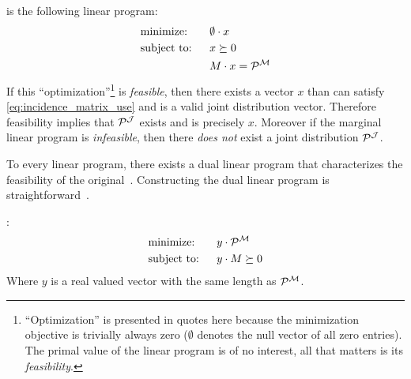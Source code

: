 \documentclass[aps, 10pt, english, twoside, pra, nofootinbib, tightenlines, longbibliography, superscriptaddress]{revtex4-1}
\begin{document}
    \begin{definition}
        \label{def:marginal_linear_program}
         is the following linear program:
        \begin{alignat*}{2}
            & \text{minimize:} \quad&& \emptyset \cdot x\\
            & \text{subject to:} && x \succeq 0 \\
            & && M \cdot x = \probvec^{\mscenario}
        \end{alignat*}
        If this ``optimization''\footnote{``Optimization'' is presented in quotes here because the minimization objective is trivially always zero ($\emptyset$ denotes the null vector of all zero entries). The primal value of the linear program is of no interest, all that matters is its \textit{feasibility}.} is \textit{feasible}, then there exists a vector $x$ than can satisfy \cref{eq:incidence_matrix_use} and is a valid joint distribution vector. Therefore feasibility implies that $\probvec^{\jointvar}$ exists and is precisely $x$. Moreover if the marginal linear program is \textit{infeasible}, then there \textit{does not} exist a joint distribution $\probvec^{\jointvar}$.
    \end{definition}

    To every linear program, there exists a dual linear program that characterizes the feasibility of the original~\cite{Schrijver_1998}. Constructing the dual linear program is straightforward~\cite{Lahaie_2008}.

    \begin{definition}
        \label{def:dual_marginal_linear_program}
        :
        \begin{alignat*}{2}
            & \text{minimize:} \quad&& y \cdot \probvec^{\mscenario}\\
            & \text{subject to:} && y \cdot M \succeq 0
        \end{alignat*}
        Where $y$ is a real valued vector with the same length as $\probvec^{\mscenario}$.
    \end{definition}
\end{document}

